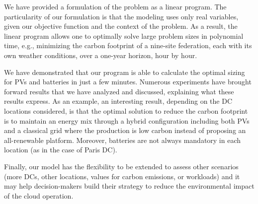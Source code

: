 We have provided a formulation of the problem as a linear program. The particularity of our formulation is that the modeling uses only real variables, given our objective function and the context of the problem. As a result, the linear program allows one to optimally solve large problem sizes in polynomial time, e.g., minimizing the carbon footprint of a nine-site federation, each with its own weather conditions, over a one-year horizon, hour by hour. 

We have demonstrated that our program is able to calculate the optimal sizing for PVs and batteries in just a few minutes. Numerous experiments have brought forward results that we have analyzed and discussed, explaining what these results express. As an example, an interesting result, depending on the DC locations considered, is that the optimal solution to reduce the carbon footprint is to maintain an energy mix through a hybrid configuration including both PVs and a classical grid where the production is low carbon instead of proposing an all-renewable platform. Moreover, batteries are not always mandatory in each location (as in the case of Paris DC). 

Finally, our model has the flexibility to be extended to assess other scenarios (more DCs, other locations, values for carbon emissions, or workloads) and it may help decision-makers build their strategy to reduce the environmental impact of the cloud operation.


